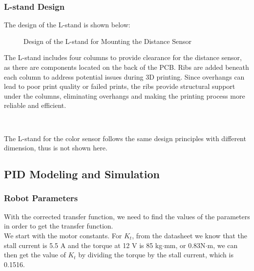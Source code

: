 \documentclass{article}
\begin{document}
\subsubsection{L-stand Design}
The design of the L-stand is shown below:
\begin{figure}[H]
    \centering
    {\setlength{\fboxsep}{0pt}}
    \caption{Design of the L-stand for Mounting the Distance Sensor}
\end{figure}

The L-stand includes four columns to provide clearance for the distance sensor,
as there are components located on the back of the PCB. Ribs are added beneath
each column to address potential issues during 3D printing. Since overhangs can
lead to poor print quality or failed prints, the ribs provide structural support
under the columns, eliminating overhangs and making the printing process more
reliable and efficient.

\

The L-stand for the color sensor follows the same design principles with
different dimension, thus is not shown here.

\subsection{PID Modeling and Simulation}
\subsubsection{Robot Parameters}

With the corrected transfer function, we need to find the values of the
parameters in order to get the transfer function. \\

We start with the motor constants. For $K_t$, from the datasheet we know
that the stall current is 5.5 A and the torque at 12 V is 85 kg$\cdot$mm, or
0.83N$\cdot$m, we can then get the value of $K_t$ by dividing the torque by the
stall current, which is 0.1516. \\
\end{document}
